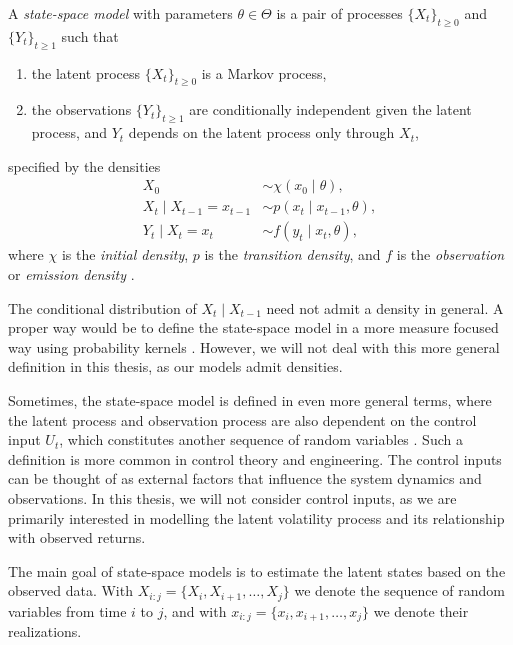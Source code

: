 \begin{definition}
    \label{def:state_space_model}
    A \emph{state-space model} with parameters $\theta \in \Theta$ is a pair of processes $\{X_t\}_{t \geq 0}$ and $\{Y_t\}_{t \geq 1}$ such that
    \begin{enumerate}
        \item the latent process $\{X_t\}_{t \geq 0}$ is a Markov process,
        \item the observations $\{Y_t\}_{t \geq 1}$ are conditionally independent given the latent process, and $Y_t$ depends on the latent process only through $X_t$,
    \end{enumerate}
    specified by the densities
    \begin{align}
        X_0 &\sim \chi(x_0 \mid \theta), \\
        X_t \mid X_{t-1}=x_{t-1} &\sim p(x_t \mid x_{t-1}, \theta), \\
        Y_t \mid X_t=x_t &\sim f(y_t \mid x_t, \theta),
    \end{align}
    where $\chi$ is the \emph{initial density}, $p$ is the \emph{transition density}, and $f$ is the \emph{observation} or \emph{emission density} \cite{chopin2020smc, doucet2001sequential,tingstrom2015smc2sv}.
\end{definition}

\begin{remark}
    The conditional distribution of $X_t \mid X_{t-1}$ need not admit a density in general. A proper way would be to define the state-space model in a more measure focused way using probability kernels \cite{chopin2020smc}.
    However, we will not deal with this more general definition in this thesis, as our models admit densities.
\end{remark}

Sometimes, the state-space model is defined in even more general terms, where the latent process and observation process are also dependent on the control input $U_t$, which constitutes another sequence of random variables \cite{murphy2012machine}. Such a definition is more common in control theory and engineering. The control inputs can be thought of as external factors that influence the system dynamics and observations. 
In this thesis, we will not consider control inputs, as we are primarily interested in modelling the latent volatility process and its relationship with observed returns.

The main goal of state-space models is to estimate the latent states based on the observed data. With $X_{i:j} = \{X_i, X_{i+1}, \ldots, X_j\}$ we denote the sequence of random variables from time $i$ to $j$, and with $x_{i:j} = \{x_i, x_{i+1}, \ldots, x_j\}$ we denote their realizations.

